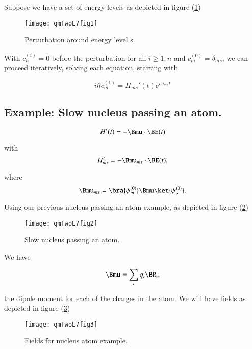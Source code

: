 Suppose we have a set of energy levels as depicted in figure (\ref{fig:qmTwoL7:1})

\begin{figure}[htp]
\centering
\texttt{[image: qmTwoL7fig1]}
\caption{Perturbation around energy level s.}\label{fig:qmTwoL7:1}
\end{figure}

With $c_n^{(i)} = 0$ before the perturbation for all $i \ge 1, n$ and $c_m^{(0)} = \delta_{ms}$, we can proceed iteratively, solving each equation, starting with

\begin{equation}\label{eqn:qmTwoL7:490}
i \hbar \dot{c}_m^{(1)} = H_{ms}'(t) e^{i \omega_{ms} t}
\end{equation}

\subsection{Example: Slow nucleus passing an atom.}

\begin{equation}\label{eqn:qmTwoL7:510}
H'(t) = - \Bmu \cdot \BE(t)
\end{equation}

with
\begin{equation}\label{eqn:qmTwoL7:530}
H_{ms}' = -\Bmu_{ms} \cdot \BE(t),
\end{equation}

where
\begin{equation}\label{eqn:qmTwoL7:550}
\Bmu_{ms} =
\bra{\psi_m^{(0)}}
\Bmu
\ket{\psi_s^{(0)}}.
\end{equation}

Using our previous nucleus passing an atom example, as depicted in figure (\ref{fig:qmTwoL7:2})

\begin{figure}[htp]
\centering
\texttt{[image: qmTwoL7fig2]}
\caption{Slow nucleus passing an atom.}\label{fig:qmTwoL7:2}
\end{figure}

We have

\begin{equation}\label{eqn:qmTwoL7:570}
\Bmu = \sum_i q_i \BR_i,
\end{equation}

the dipole moment for each of the charges in the atom.  We will have fields as depicted in figure (\ref{fig:qmTwoL7:3})

\begin{figure}[htp]
\centering
\texttt{[image: qmTwoL7fig3]}
\caption{Fields for nucleus atom example.}\label{fig:qmTwoL7:3}
\end{figure}

